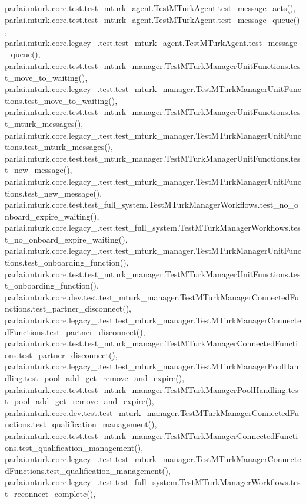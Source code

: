 parlai.\+mturk.\+core.\+test.\+test\+\_\+mturk\+\_\+agent.\+Test\+M\+Turk\+Agent.\+test\+\_\+message\+\_\+acts(), parlai.\+mturk.\+core.\+test.\+test\+\_\+mturk\+\_\+agent.\+Test\+M\+Turk\+Agent.\+test\+\_\+message\+\_\+queue(), parlai.\+mturk.\+core.\+legacy\+\_.\+test.\+test\+\_\+mturk\+\_\+agent.\+Test\+M\+Turk\+Agent.\+test\+\_\+message\+\_\+queue(), parlai.\+mturk.\+core.\+test.\+test\+\_\+mturk\+\_\+manager.\+Test\+M\+Turk\+Manager\+Unit\+Functions.\+test\+\_\+move\+\_\+to\+\_\+waiting(), parlai.\+mturk.\+core.\+legacy\+\_.\+test.\+test\+\_\+mturk\+\_\+manager.\+Test\+M\+Turk\+Manager\+Unit\+Functions.\+test\+\_\+move\+\_\+to\+\_\+waiting(), parlai.\+mturk.\+core.\+test.\+test\+\_\+mturk\+\_\+manager.\+Test\+M\+Turk\+Manager\+Unit\+Functions.\+test\+\_\+mturk\+\_\+messages(), parlai.\+mturk.\+core.\+legacy\+\_.\+test.\+test\+\_\+mturk\+\_\+manager.\+Test\+M\+Turk\+Manager\+Unit\+Functions.\+test\+\_\+mturk\+\_\+messages(), parlai.\+mturk.\+core.\+test.\+test\+\_\+mturk\+\_\+manager.\+Test\+M\+Turk\+Manager\+Unit\+Functions.\+test\+\_\+new\+\_\+message(), parlai.\+mturk.\+core.\+legacy\+\_.\+test.\+test\+\_\+mturk\+\_\+manager.\+Test\+M\+Turk\+Manager\+Unit\+Functions.\+test\+\_\+new\+\_\+message(), parlai.\+mturk.\+core.\+test.\+test\+\_\+full\+\_\+system.\+Test\+M\+Turk\+Manager\+Workflows.\+test\+\_\+no\+\_\+onboard\+\_\+expire\+\_\+waiting(), parlai.\+mturk.\+core.\+legacy\+\_.\+test.\+test\+\_\+full\+\_\+system.\+Test\+M\+Turk\+Manager\+Workflows.\+test\+\_\+no\+\_\+onboard\+\_\+expire\+\_\+waiting(), parlai.\+mturk.\+core.\+legacy\+\_.\+test.\+test\+\_\+mturk\+\_\+manager.\+Test\+M\+Turk\+Manager\+Unit\+Functions.\+test\+\_\+onboarding\+\_\+function(), parlai.\+mturk.\+core.\+test.\+test\+\_\+mturk\+\_\+manager.\+Test\+M\+Turk\+Manager\+Unit\+Functions.\+test\+\_\+onboarding\+\_\+function(), parlai.\+mturk.\+core.\+dev.\+test.\+test\+\_\+mturk\+\_\+manager.\+Test\+M\+Turk\+Manager\+Connected\+Functions.\+test\+\_\+partner\+\_\+disconnect(), parlai.\+mturk.\+core.\+legacy\+\_.\+test.\+test\+\_\+mturk\+\_\+manager.\+Test\+M\+Turk\+Manager\+Connected\+Functions.\+test\+\_\+partner\+\_\+disconnect(), parlai.\+mturk.\+core.\+test.\+test\+\_\+mturk\+\_\+manager.\+Test\+M\+Turk\+Manager\+Connected\+Functions.\+test\+\_\+partner\+\_\+disconnect(), parlai.\+mturk.\+core.\+legacy\+\_.\+test.\+test\+\_\+mturk\+\_\+manager.\+Test\+M\+Turk\+Manager\+Pool\+Handling.\+test\+\_\+pool\+\_\+add\+\_\+get\+\_\+remove\+\_\+and\+\_\+expire(), parlai.\+mturk.\+core.\+test.\+test\+\_\+mturk\+\_\+manager.\+Test\+M\+Turk\+Manager\+Pool\+Handling.\+test\+\_\+pool\+\_\+add\+\_\+get\+\_\+remove\+\_\+and\+\_\+expire(), parlai.\+mturk.\+core.\+dev.\+test.\+test\+\_\+mturk\+\_\+manager.\+Test\+M\+Turk\+Manager\+Connected\+Functions.\+test\+\_\+qualification\+\_\+management(), parlai.\+mturk.\+core.\+test.\+test\+\_\+mturk\+\_\+manager.\+Test\+M\+Turk\+Manager\+Connected\+Functions.\+test\+\_\+qualification\+\_\+management(), parlai.\+mturk.\+core.\+legacy\+\_.\+test.\+test\+\_\+mturk\+\_\+manager.\+Test\+M\+Turk\+Manager\+Connected\+Functions.\+test\+\_\+qualification\+\_\+management(), parlai.\+mturk.\+core.\+legacy\+\_.\+test.\+test\+\_\+full\+\_\+system.\+Test\+M\+Turk\+Manager\+Workflows.\+test\+\_\+reconnect\+\_\+complete(), 
